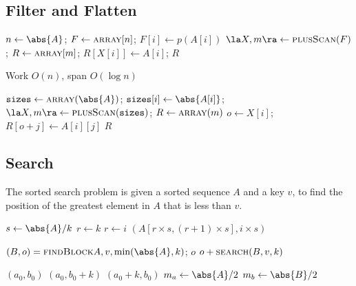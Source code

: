 \documentclass[11pt]{article}
\begin{document}
\subsection{Filter and Flatten}
\label{sec:orgba2c040}
\begin{algorithmic}
        \State \(n\gets\abs{A}\);
        \State \(F\gets\textsc{array}[n]\);
        \State \(F[i]\gets p(A[i])\)
        \EndFor
        \State \(\la X,m\ra\gets\textsc{plusScan}(F)\);
        \State \(R\gets\textsc{array}[m]\);
                \State\(R[X[i]]\gets A[i]\);
        \EndIf
        \EndFor
        \State\Return \(R\)
\EndFunction
\end{algorithmic}

Work \(O(n)\), span \(O(\log n)\)

\begin{algorithmic}
\State \(\texttt{sizes}\gets\textsc{array}(\abs{A})\);
        \State \(\texttt{sizes}[i]\gets\abs{A[i]}\);
\EndFor
\State \(\la X,m\ra\gets\textsc{plusScan}(\texttt{sizes})\);
\State \(R\gets\textsc{array}(m)\)
        \State \(o\gets X[i]\);
                \State\(R[o+j]\gets A[i][j]\)
        \EndFor
\EndFor
\State \Return\(R\)
\EndFunction
\end{algorithmic}
\subsection{Search}
\label{sec:org9a87c34}
The sorted search problem is given a sorted sequence \(A\) and a key \(v\), to find the position of the
greatest element in \(A\) that is less than \(v\).

\begin{algorithmic}
\State \(s\gets\abs{A}/k\)
\State \(r\gets k\)
                \State \(r\gets i\)
        \EndIf
\EndFor
\State \Return \((A[r\times s,(r+1)\times s],i\times s)\)
\EndFunction
\end{algorithmic}

\begin{algorithmic}
\State \((B,o)=\textsc{findBlock}{A,v,\min(\abs{A},k)}\);
        \State \Return \(o\)
\Else
        \State \Return \(o+\textsc{search}(B,v,k)\)
\EndIf
\EndFunction
\end{algorithmic}

\begin{algorithmic}
        \State \Return \((a_0,b_0)\)
        \State \Return \((a_0,b_0+k)\)
        \State \Return \((a_0+k,b_0)\)
\Else
        \State \(m_a\gets\abs{A}/2\)
        \State \(m_b\gets\abs{B}/2\)
        
\EndIf
\EndFunction
\end{algorithmic}
\end{document}
